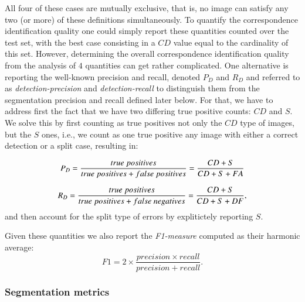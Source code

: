 \documentclass[a4paper,authoryear,review]{elsarticle}
\begin{document}
All four of these cases are mutually exclusive, that is, no image can satisfy any two (or more) of these definitions simultaneously. To quantify the correspondence identification quality one could simply report these quantities counted over the test set, with the best case consisting in a $CD$ value equal to the cardinality of this set. However, determining the overall correspondence identification quality from the analysis of $4$ quantities can get rather complicated. 
%
One alternative is reporting the well-known precision and recall, denoted $P_D$ and $R_D$ and referred to as  \emph{detection-precision} and \emph{detection-recall} to distinguish them from the segmentation precision and recall defined later below. For that, we have to address first the fact that  we have two differing true positive counts: $CD$ and $S$. We solve this by first counting as true positives not only the $CD$ type of images, but the $S$ ones, i.e., we count as one true positive any image with either a correct detection or a split case, resulting in:

\begin{equation}
    P_D = \frac{true\ positives}{true\ positives+false\ positives} \\
= \frac{CD+S}{CD+S+FA}
    \label{eq:detection-precision}
\end{equation}

\begin{equation}
    R_D = \frac{true\ positives}{true\ positives+false\ negatives} \\
= \frac{CD+S}{CD+S+DF},
    \label{eq:detection-recall}
\end{equation}
and then account for the split type of errors by explitictely reporting $S$. 

Given these quantities we also report the \emph{F1-measure} computed as their harmonic average:
\[
    F1 = 2 \times \frac{precision \times recall}{precision + recall}.
\] 


 \subsubsection{Segmentation metrics} \label{subsec:segmetrics}
\end{document}
